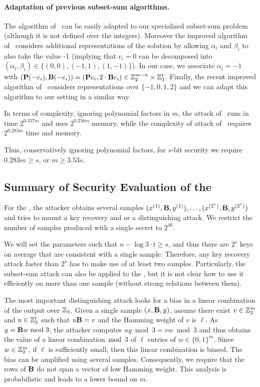 \paragraph{Adaptation of previous subset-sum algorithms.}
The algorithm of~\cite{Howgrave-GrahamJ10} can be easily adapted
to our specialized subset-sum problem (although it is not defined over the integers).
Moreover the improved algorithm of~\cite{BeckerCJ11} considers additional representations
of the solution by allowing $\alpha_i$ and $\beta_i$ to also take the value -1
(implying that $\epsilon_i = 0$ can be decomposed into
$(\alpha_i,\beta_i) \in \{(0,0),(-1,1),(1,-1)\}$).
In our case, we associate $\alpha_i = -1$
with $(\mat{P}(-e_i), \mat{B}(-e_i)) = (\mat{P}e_i, 2 \cdot \mat{B}e_i)  \in \Z_2^{m-n} \times \Z_3^t$.
Finally, the recent improved algorithm of~\cite{BonnetainBSS20} considers representations over
$\{-1,0,1,2\}$ and we can adapt this algorithm to our setting in a similar way.

In terms of complexity, ignoring polynomial factors in $m$,
the attack of~\cite{Howgrave-GrahamJ10} runs in time $2^{0.337m}$ and uses $2^{0.256m}$ memory,
while the complexity of attack of~\cite{BonnetainBSS20} requires $2^{0.283m}$ time and memory.

Thus, conservatively ignoring polynomial factors, for $s$-bit security we require $0.283m \geq s$, or $m \geq 3.53 s$.

\subsection{Summary of Security Evaluation of the \ttwPRF}

For the \ttwPRF, the attacker obtains several samples 
$(x^{(1)},\mat{B},y^{(1)}) ,\ldots, (x^{(2^r)},
\mat{B},y^{(2^r)})$
and tries to
mount a key recovery and or a distinguishing attack.
We restrict the number of samples produced with a single secret to $2^{40}$.

We will set the parameters such that $n - \log 3 \cdot t \geq s$,
and thus there are $2^s$ keys on average that are consistent with a single sample.
Therefore, any key recovery attack faster than $2^s$ has to make use of at least two samples.
Particularly, the subset-sum attack can also be applied to the \ttwPRF,
but it is not clear how to use it efficiently on more than one sample
(without strong relations between them).

The most important distinguishing attack looks for a bias in a linear combination
of the output over $\mathbb{Z}_3$.
Given a single sample $(x,\mat{B},y)$, assume there exist
$v \in \mathbb{Z}_3^m$ and $u \in \mathbb{Z}_3^t$ such that $u \mat{B} = v$ and the Hamming weight of $v$ is $\ell$.
As $y = \mat{B}w \bmod 3$, the attacker computes $uy \bmod 3 = vw \bmod 3$
and thus obtains the value of a linear combination $\bmod$ 3 of $\ell$ entries of $w \in \{0,1\}^m$.
Since $w \in \mathbb{Z}_2^m$, if $\ell$ is sufficiently small, then this linear combination is biased.
The bias can be amplified using several samples.
Consequently, we require that the rows of $\mat{B}$ do not span a vector of low Hamming weight.
This analysis is probabilistic and leads to a lower bound on $m$.

